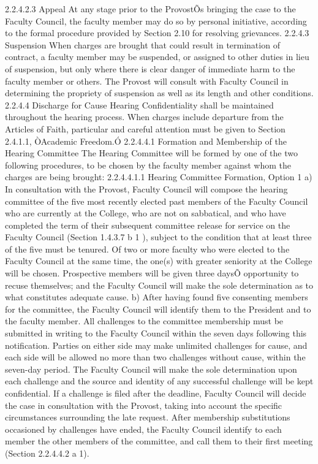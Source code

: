 \documentclass[letterpaper, 11pt]{article}
\begin{document}
	2.2.4.2.3 Appeal
	At any stage prior to the ProvostÕs bringing the case to the Faculty Council, the faculty member may do so by personal initiative, according to the formal procedure provided by Section 2.10 for resolving grievances.
	2.2.4.3 Suspension
	When charges are brought that could result in termination of contract, a faculty member may be suspended, or assigned to other duties in lieu of suspension, but only where there is clear danger of immediate harm to the faculty member or others.  The Provost will consult with Faculty Council in determining the propriety of suspension as well as its length and other conditions.
	2.2.4.4 Discharge for Cause Hearing
	Confidentiality shall be maintained throughout the hearing process.  When charges include departure from the Articles of Faith, particular and careful attention must be given to Section 2.4.1.1, ÒAcademic Freedom.Ó
	2.2.4.4.1 Formation and Membership of the Hearing Committee
	The Hearing Committee will be formed by one of the two following procedures, to be chosen by the faculty member against whom the charges are being brought:
	2.2.4.4.1.1 Hearing Committee Formation, Option 1
	a) In consultation with the Provost, Faculty Council will compose the hearing committee of the five most recently elected past members of the Faculty Council who are currently at the College, who are not on sabbatical, and who have completed the term of their subsequent committee release for service on the Faculty Council (Section 1.4.3.7 b 1 ), subject to the condition that at least three of the five must be tenured.  Of two or more faculty who were elected to the Faculty Council at the same time, the one(s) with greater seniority at the College will be chosen.  Prospective members will be given three daysÕ opportunity to recuse themselves; and the Faculty Council will make the sole determination as to what constitutes adequate cause.
	b) After having found five consenting members for the committee, the Faculty Council will identify them to the President and to the faculty member.  All challenges to the committee membership must be submitted in writing to the Faculty Council within the seven days following this notification.  Parties on either side may make unlimited challenges for cause, and each side will be allowed no more than two challenges without cause, within the seven-day period.  The Faculty Council will make the sole determination upon each challenge and the source and identity of any successful challenge will be kept confidential.  If a challenge is filed after the deadline, Faculty Council will decide the case in consultation with the Provost, taking into account the specific circumstances surrounding the late request.  After membership substitutions occasioned by challenges have ended, the Faculty Council identify to each member the other members of the committee, and call them to their first meeting (Section 2.2.4.4.2 a 1).
\end{document}
